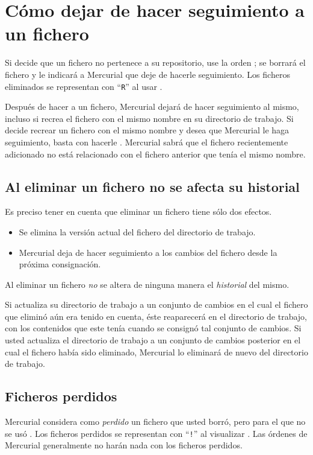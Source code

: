 \section{Cómo dejar de hacer seguimiento a un fichero}

Si decide que un fichero no pertenece a su repositorio, use la orden
; se borrará el fichero y le indicará a Mercurial que
deje de hacerle seguimiento.  Los ficheros eliminados se representan
con ``\texttt{R}'' al usar .

Después de hacer  a un fichero, Mercurial dejará de
hacer seguimiento al mismo, incluso si recrea el fichero con el mismo
nombre en su directorio de trabajo. Si decide recrear un fichero con
el mismo nombre y desea que Mercurial le haga seguimiento, basta con
hacerle . Mercurial sabrá que el fichero recientemente
adicionado no está relacionado con el fichero anterior que tenía el
mismo nombre.

\subsection{Al eliminar un fichero no se afecta su historial}

Es preciso tener en cuenta que eliminar un fichero tiene sólo dos
efectos.
\begin{itemize}
\item Se elimina la versión actual del fichero del directorio de 
trabajo.
\item Mercurial deja de hacer seguimiento a los cambios del fichero
  desde la próxima consignación.
\end{itemize}
Al eliminar un fichero \emph{no} se altera de ninguna manera el
\emph{historial} del mismo.

Si actualiza su directorio de trabajo a un conjunto de cambios en el
cual el fichero que eliminó aún era tenido en cuenta, éste reaparecerá en
el directorio de trabajo, con los contenidos que este tenía cuando se
consignó tal conjunto de cambios.  Si usted actualiza el directorio de
trabajo a un conjunto de cambios posterior en el cual el fichero había
sido eliminado, Mercurial lo eliminará de nuevo del directorio de
trabajo.

\subsection{Ficheros perdidos}

Mercurial considera como \emph{perdido} un fichero que usted borró,
pero para el que no se usó .  Los ficheros perdidos se
representan con ``\texttt{!}'' al visualizar .
Las órdenes de Mercurial generalmente no harán nada con los ficheros
perdidos.

